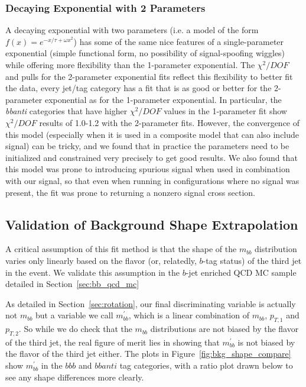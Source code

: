 \subsubsection{Decaying Exponential with 2 Parameters}
A decaying exponential with two parameters (i.e. a model of the form  $f(x)=e^{-x/\tau+\omega x^2}$)
has some of the same nice features of a single-parameter exponential (simple functional
form, no possibility of signal-spoofing wiggles) while offering
more flexibility than the 1-parameter exponential.  The $\chi^2/DOF$ and pulls
for the 2-parameter exponential fits reflect this flexibility to better
fit the data, every jet/tag category has a fit that is as good or better
for the 2-parameter exponential as for the 1-parameter exponential.  In 
particular, the \textit{bbanti} categories that have higher $\chi^2/DOF$ values
in the 1-parameter fit show $\chi^2/DOF$ results of 1.0-1.2 with the 2-parameter fits. 
However, the convergence of this model (especially when it is used in a composite
model that can also include signal) can be tricky, and we found that in practice
the parameters need to be initialized and constrained very precisely to get
good results.  We also found that this model was prone to introducing spurious
signal when used in combination with our signal, so that even when running in 
configurations where no signal was present, the fit was prone to returning
a nonzero signal cross section.




\subsection{Validation of Background Shape Extrapolation}
A critical assumption of this fit method is that the shape of the $m_{bb}$ distribution
varies only linearly based on the flavor (or, relatedly, $b$-tag status)
of the third jet in the event.  We validate this assumption in the $b$-jet enriched 
QCD MC sample detailed in Section~\ref{sec:bb_qcd_mc}

As detailed in Section~\ref{sec:rotation}, our final discriminating variable is actually
not $m_{bb}$ but a variable we call $m_{bb}^{'}$, 
which is a linear combination of $m_{bb}$, $p_{T,1}$ and $p_{T,2}$.  So while we
do check that the $m_{bb}$ distributions are not biased by the flavor of the third jet,
the real figure of merit lies in showing that $m_{bb}^{'}$ is not biased by the
flavor of the third jet either.  The plots in Figure~\ref{fig:bkg_shape_compare}
show $m_{bb}^{'}$ in the $bbb$ and $bbanti$ tag categories, with a ratio plot drawn below
to see any shape differences more clearly.  


